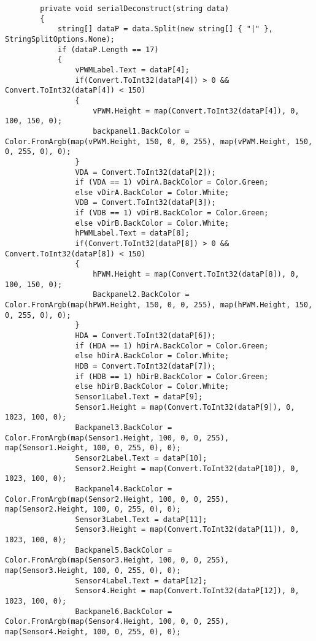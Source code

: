 \begin{lstlisting}
        private void serialDeconstruct(string data)
        {
            string[] dataP = data.Split(new string[] { "|" }, StringSplitOptions.None);
            if (dataP.Length == 17)
            {
                vPWMLabel.Text = dataP[4];
                if(Convert.ToInt32(dataP[4]) > 0 && Convert.ToInt32(dataP[4]) < 150)
                {
                    vPWM.Height = map(Convert.ToInt32(dataP[4]), 0, 100, 150, 0);
                    backpanel1.BackColor = Color.FromArgb(map(vPWM.Height, 150, 0, 0, 255), map(vPWM.Height, 150, 0, 255, 0), 0);
                }
                VDA = Convert.ToInt32(dataP[2]);
                if (VDA == 1) vDirA.BackColor = Color.Green;
                else vDirA.BackColor = Color.White;
                VDB = Convert.ToInt32(dataP[3]);
                if (VDB == 1) vDirB.BackColor = Color.Green;
                else vDirB.BackColor = Color.White;
                hPWMLabel.Text = dataP[8];
                if(Convert.ToInt32(dataP[8]) > 0 && Convert.ToInt32(dataP[8]) < 150)
                {
                    hPWM.Height = map(Convert.ToInt32(dataP[8]), 0, 100, 150, 0);
                    Backpanel2.BackColor = Color.FromArgb(map(hPWM.Height, 150, 0, 0, 255), map(hPWM.Height, 150, 0, 255, 0), 0);
                }
                HDA = Convert.ToInt32(dataP[6]);
                if (HDA == 1) hDirA.BackColor = Color.Green;
                else hDirA.BackColor = Color.White;
                HDB = Convert.ToInt32(dataP[7]);
                if (HDB == 1) hDirB.BackColor = Color.Green;
                else hDirB.BackColor = Color.White;
                Sensor1Label.Text = dataP[9];
                Sensor1.Height = map(Convert.ToInt32(dataP[9]), 0, 1023, 100, 0);
                Backpanel3.BackColor = Color.FromArgb(map(Sensor1.Height, 100, 0, 0, 255), map(Sensor1.Height, 100, 0, 255, 0), 0);
                Sensor2Label.Text = dataP[10];
                Sensor2.Height = map(Convert.ToInt32(dataP[10]), 0, 1023, 100, 0);
                Backpanel4.BackColor = Color.FromArgb(map(Sensor2.Height, 100, 0, 0, 255), map(Sensor2.Height, 100, 0, 255, 0), 0);
                Sensor3Label.Text = dataP[11];
                Sensor3.Height = map(Convert.ToInt32(dataP[11]), 0, 1023, 100, 0);
                Backpanel5.BackColor = Color.FromArgb(map(Sensor3.Height, 100, 0, 0, 255), map(Sensor3.Height, 100, 0, 255, 0), 0);
                Sensor4Label.Text = dataP[12];
                Sensor4.Height = map(Convert.ToInt32(dataP[12]), 0, 1023, 100, 0);
                Backpanel6.BackColor = Color.FromArgb(map(Sensor4.Height, 100, 0, 0, 255), map(Sensor4.Height, 100, 0, 255, 0), 0);

\end{lstlisting}
